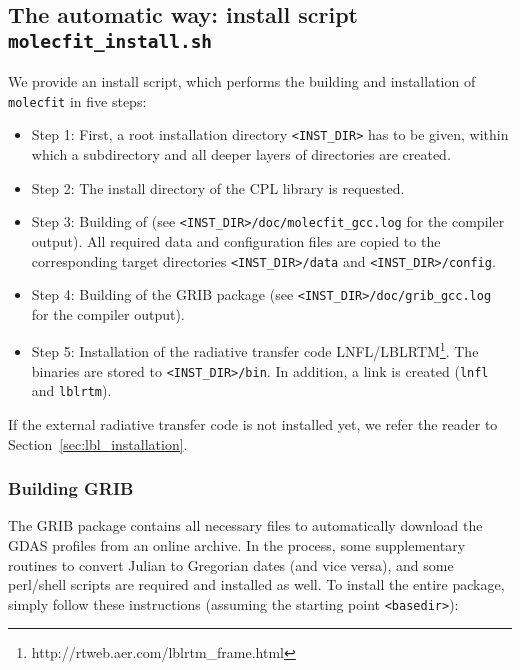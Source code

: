 \subsection{The automatic way: install script {\tt molecfit\_install.sh}}
\label{sec:installscript}
We provide an install script, which performs the building and installation
of {\tt molecfit} in five steps:
\begin{itemize}
    \item Step 1: First, a root installation directory {\tt <INST\_DIR>} has to
          be given, within which a subdirectory \mf{} and all deeper
          layers of directories are created.
    \item Step 2: The install directory of the CPL library is requested.
    \item Step 3: Building of \mf{} (see
          {\tt <INST\_DIR>/doc/molecfit\_gcc.log} for the compiler
          output). All required data and configuration files are copied to the
          corresponding target directories {\tt <INST\_DIR>/data} and
          {\tt <INST\_DIR>/config}.
    \item Step 4: Building of the \ac{GRIB} package (see
          {\tt <INST\_DIR>/doc/grib\_gcc.log} for the compiler
          output).
    \item Step 5: Installation of the radiative transfer code
          \ac{LNFL}/\ac{LBLRTM}\footnote{http://rtweb.aer.com/lblrtm\_frame.html}.
          The binaries are stored to {\tt <INST\_DIR>/bin}. In
          addition, a link is created (\verb|lnfl| and \verb|lblrtm|).
\end{itemize}
If the external radiative transfer code is not installed yet, we refer the
reader to Section~\ref{sec:lbl_installation}.

\subsubsection{Building GRIB}\label{sec:grib_building}
The \ac{GRIB} package contains all necessary files to automatically download
the \ac{GDAS} profiles from an online archive. In the process, some
supplementary routines to convert Julian to Gregorian dates (and vice versa),
and some perl/shell scripts are required and installed as well. To install the
entire package, simply follow these instructions (assuming the starting point
{\tt <basedir>}):

